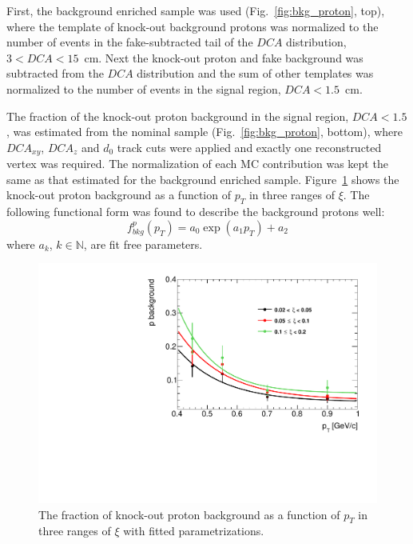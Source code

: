 First, the background enriched sample was used  (Fig.~\ref{fig:bkg_proton}, top), where the template of knock-out background protons was normalized to the number of events in the fake-subtracted tail of the $DCA$ distribution, $3<DCA<15$~cm. Next the knock-out proton and fake background was subtracted from the $DCA$ distribution and the sum of other templates was normalized to the number of events in the signal region,  $DCA<1.5$~cm. 


The fraction of the knock-out proton background in the signal region, $DCA<1.5$, was estimated from the nominal sample (Fig.~\ref{fig:bkg_proton}, bottom), where $DCA_{xy}$, $DCA_z$ and $d_0$ track cuts were applied and exactly one reconstructed vertex was required. The normalization of each MC contribution was kept the same as that estimated for the background enriched sample. Figure~\ref{fig:bkg_proton_fit} shows the knock-out proton background as a function of $p_T$ in three ranges of $\xi$. The following functional form was found to describe the
background protons well:
\begin{equation}
f_{bkg}^{p}\left(p_T\right) = a_0\exp\left(a_1p_T\right)+a_2
\end{equation}
where  $a_k$, $k \in \mathbb N$, are fit free parameters. \\
\captionsetup{format=plain,indention=0pt,justification=justified}
\begin{figure}
	\centering
	\vspace{-20pt}
	\includegraphics[width=\linewidth, page=1]{chapters/chrgSTAR/img/DCAproton/bkg_p.pdf}
	\vspace{-20pt}
	\caption{The fraction of knock-out proton background  as a function of $p_T$ in three ranges of $\xi$  with  fitted parametrizations.}
	\vspace{-80pt}
	\label{fig:bkg_proton_fit}
\end{figure}
